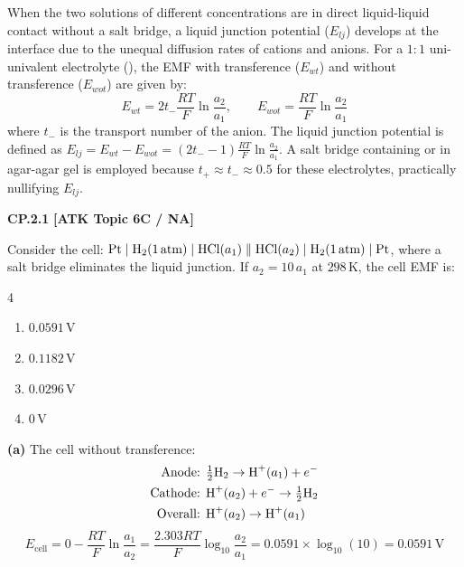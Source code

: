 When the two solutions of different concentrations are in direct liquid-liquid contact without a salt bridge, a liquid junction potential ($E_{lj}$) develops at the interface due to the unequal diffusion rates of cations and anions. For a $1:1$ uni-univalent electrolyte (), the EMF with transference ($E_{wt}$) and without transference ($E_{wot}$) are given by:
\begin{equation*}
    E_{wt} = 2 t_- \frac{RT}{F} \ln \frac{a_2}{a_1}, \qquad E_{wot} = \frac{RT}{F} \ln \frac{a_2}{a_1}
\end{equation*}
where $t_-$ is the transport number of the anion. The liquid junction potential is defined as $E_{lj} = E_{wt} - E_{wot} = (2t_- - 1)\frac{RT}{F}\ln \frac{a_2}{a_1}$. A salt bridge containing  or  in agar-agar gel is employed because $t_+ \approx t_- \approx 0.5$ for these electrolytes, practically nullifying $E_{lj}$.

\begin{problembox}
\textbf{CP.2.1} \hfill \textbf{[ATK Topic 6C / NA]}

Consider the cell: $\ce{Pt} \mid \ce{H2}(1\,\text{atm}) \mid \ce{HCl}(a_1) \parallel \ce{HCl}(a_2) \mid \ce{H2}(1\,\text{atm}) \mid \ce{Pt}$, where a salt bridge eliminates the liquid junction. If $a_2 = 10\,a_1$ at $298\,\text{K}$, the cell EMF is:
\begin{multicols}{4}
\begin{enumerate}[label=(\alph*)]
    \item $0.0591\,\text{V}$
    \item $0.1182\,\text{V}$
    \item $0.0296\,\text{V}$
    \item $0\,\text{V}$
\end{enumerate}
\end{multicols}
\end{problembox}
\begin{solution}
\textbf{(a)}
The cell without transference:
\begin{align*}
    \text{Anode: } & \tfrac{1}{2}\ce{H2} \to \ce{H+}(a_1) + e^- \\
    \text{Cathode: } & \ce{H+}(a_2) + e^- \to \tfrac{1}{2}\ce{H2} \\
    \text{Overall: } & \ce{H+}(a_2) \to \ce{H+}(a_1)
\end{align*}
\begin{equation*}
    E_{\text{cell}} = 0 - \frac{RT}{F}\ln \frac{a_1}{a_2} = \frac{2.303 RT}{F} \log_{10} \frac{a_2}{a_1} = 0.0591 \times \log_{10}(10) = 0.0591\,\text{V}
\end{equation*}
\end{solution}

